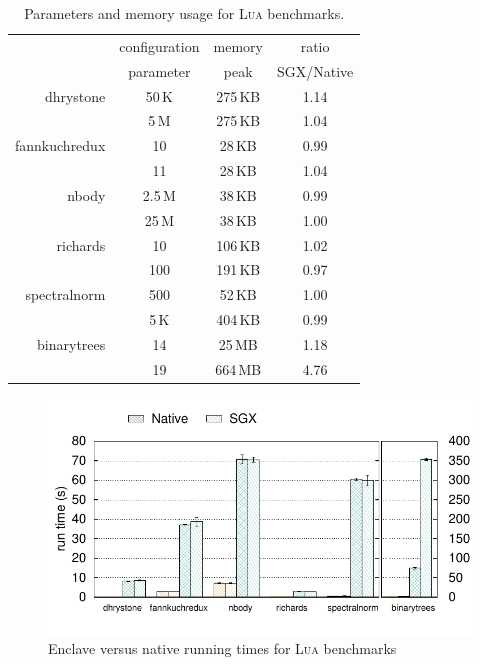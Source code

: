 \newcommand{\higparamcolor}{\rowcolor[rgb]{0.79,0.91,0.90}\cellcolor{white}}
\newcommand{\lowparamcolor}{\rowcolor[rgb]{0.94,0.88,0.76}\cellcolor{white}}
\begin{table}[t!]
    \centering
    \begin{tabular}{r|c|c|c}
                       &configuration &memory      &ratio \\
                       &parameter     &peak        &SGX/Native \\
\hline
\lowparamcolor
\textsf{dhrystone}     &50\,K      &275\,KB       & 1.14 \\
\higparamcolor
                       &5\,M       &275\,KB       & 1.04 \\
\hline
\lowparamcolor
\textsf{fannkuchredux} &10         &28\,KB        & 0.99 \\
\higparamcolor
                       &11         &28\,KB        & 1.04 \\
\hline
\lowparamcolor
\textsf{nbody}         &2.5\,M     &38\,KB        & 0.99 \\
\higparamcolor
                       &25\,M      &38\,KB        & 1.00 \\
\hline
\lowparamcolor
\textsf{richards}      &10         &106\,KB       & 1.02 \\
\higparamcolor
                       &100        &191\,KB       & 0.97 \\
\hline
\lowparamcolor
\textsf{spectralnorm}  &500        &52\,KB        & 1.00 \\
\higparamcolor
                       &5\,K       &404\,KB       & 0.99 \\
\hline
\lowparamcolor
\textsf{binarytrees}   &14         &25\,MB        & 1.18 \\
\higparamcolor
                       &19         &664\,MB       & 4.76 \\
    \end{tabular}
    \caption{Parameters and memory usage for \textsc{Lua} benchmarks.}
  \label{tab:luabmarks}
\end{table}

\begin{figure}[t!]
  \centering
  \includegraphics[width=\linewidth]{plots/microbenchmark_luasgx/microbenchmark_luasgx}
  \caption{Enclave versus native running times for \textsc{Lua} benchmarks}
  \label{fig:luabenchs}
\end{figure}

